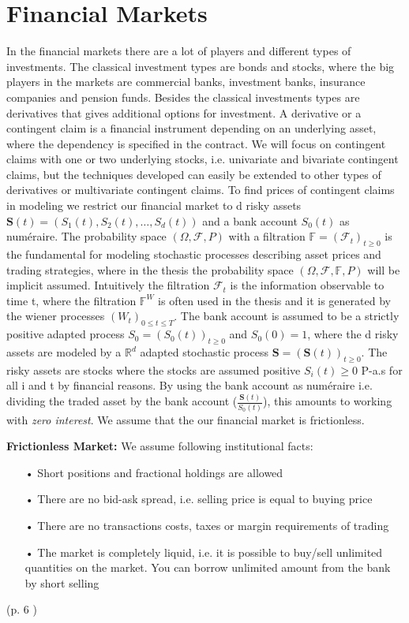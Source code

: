 \section{Financial Markets}\label{FinMarket}
In the financial markets there are a lot of players and different types of investments. The classical investment types are bonds and stocks, where the big players in the markets are commercial banks, investment banks, insurance companies and pension funds. Besides the classical investments types are derivatives that gives additional options for investment. A derivative or a contingent claim is a financial instrument depending on an underlying asset, where the dependency is specified in the contract. We will focus on contingent claims with one or two underlying stocks, i.e. univariate and bivariate contingent claims, but the techniques developed can easily be extended to other types of derivatives or multivariate contingent claims. To find prices of contingent claims in modeling we restrict our financial market to d risky assets $\bm{S}(t)=(S_1(t), S_2(t),\ldots, S_d(t))$ and a bank account $S_0(t)$ as numéraire. The probability space $(\Omega, \mathcal{F}, P)$ with a filtration $\mathbb{F}=(\mathcal{F}_t)_{t\geq 0}$ is the fundamental for modeling stochastic processes describing asset prices and trading strategies, where in the thesis the probability space $(\Omega, \mathcal{F}, \mathbb{F}, P)$ will be implicit assumed. Intuitively the filtration $\mathcal{F}_t$ is the information observable to time t, where the filtration $\mathbb{F}^{W}$ is often used in the thesis and it is generated by the wiener processes $(W_t)_{0\leq t \leq T}$. The bank account is assumed to be a strictly positive adapted process $S_0=(S_0 (t))_{t \geq 0}$ and $S_0(0)=1$, where the d risky assets are modeled by a $\mathbb{R}^d$ adapted stochastic process $\bm{S}=(\bm{S}(t))_{t\geq 0}$. The risky assets are stocks where the stocks are assumed positive $S_i(t)\geq 0$ P-a.s for all i and t by financial reasons. By using the bank account as numéraire i.e. dividing the traded asset by the bank account ($\frac{\bm{S}(t)}{S_0 (t)}$), this amounts to working with \textit{zero interest}. We assume that the our financial market is frictionless.
\theoremstyle{assumption}
\begin{assumption}{\textbf{Frictionless Market: }}\label{EfficientMarket}
We assume following institutional facts:
\begin{enumerate}
\item[•] Short positions and fractional holdings are allowed
\item[•] There are no bid-ask spread, i.e. selling price is equal to buying price
\item[•] There are no transactions costs, taxes or margin requirements of trading
\item[•] The market is completely liquid, i.e. it is possible to buy/sell unlimited quantities on the market. You can borrow unlimited amount from the bank by short selling
\end{enumerate}
(p. 6 \parencite{finKont})
\end{assumption}
